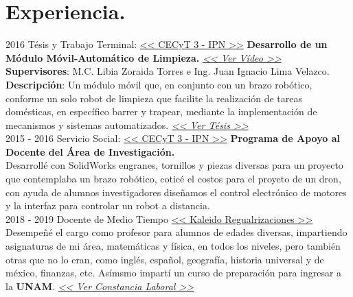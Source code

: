 \documentclass[]{friggeri-cv}
\begin{document}
\section{Experiencia.}
\begin{entrylist}
    
    \entry
    {2016}
    {Tésis y Trabajo Terminal: }
    {\href{https://cecyt3.ipn.mx}{<< CECyT 3 - IPN >>}}
    { \textbf{Desarrollo de un Módulo Móvil-Automático de Limpieza.}
    \href{https://www.youtube.com/watch?v=zbDAjEfyKrY}{   \textit{<< Ver Vídeo >>}}
    \\
    \textbf{Supervisores}: M.C. Libia Zoraida Torres e Ing. Juan Ignacio Lima Velazco.\\
    \textbf{Descripción}: Un módulo móvil que, en conjunto con un brazo robótico, conforme un solo robot de limpieza que facilite la realización de tareas domésticas, en específico barrer y trapear, mediante la implementación de mecanismos y sistemas automatizados. \href{https://drive.google.com/file/d/12gbIxFkS-cf5gG1gvyKvA9u7UeBOZkpy/view?usp=sharing}{\textit{<< Ver Tésis >>}}\\
    }
  \entry
    {2015 - 2016}
    {Servicio Social:}
    {\href{https://cecyt3.ipn.mx}{<< CECyT 3 - IPN >>}}
    {\textbf{Programa de Apoyo al Docente del Área de Investigación.}
    \\
    Desarrollé con SolidWorks engranes, tornillos y piezas diversas para un proyecto que contemplaba un brazo robótico, coticé el costos para el proyeto de un dron, con ayuda de alumnos investigadores diseñamos el control electrónico de motores y la interfaz para controlar un robot a distancia.\\}
    \entry
    {2018 - 2019}
    {Docente de Medio Tiempo }
    {\href{https://www.facebook.com/Kaleido.edu/}{<< Kaleido Regualrizaciones >>}}
    { Desempeñé el cargo como profesor para alumnos de edades diversas, impartiendo asignaturas de mi área, matemáticas y física, en todos los niveles,  pero también otras que no lo eran, como inglés, español, geografía, historia universal y de méxico, finanzas, etc. Asímsmo impartí un curso de preparación para ingresar a la \textbf{UNAM}. \href{https://drive.google.com/file/d/1w9CVCy-d3eIhm1HHeQm1GP25B_DY_1Zo/view?usp=sharing}{\textit{<< Ver Constancia Laboral >>}} \\}
    
\end{entrylist}
\newpage
\end{document}
